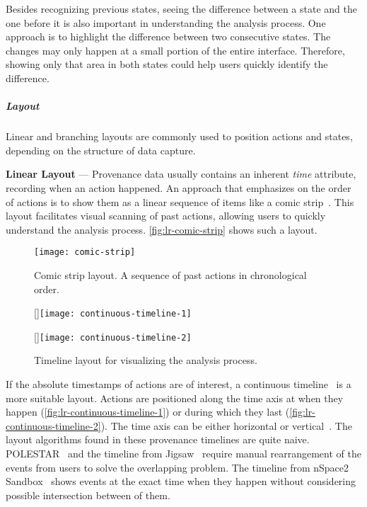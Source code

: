 Besides recognizing previous states, seeing the difference between a state and the one before it is also important in understanding the analysis process. One approach is to highlight the difference between two consecutive states. The changes may only happen at a small portion of the entire interface. Therefore, showing only that area in both states could help users quickly identify the difference.

\subparagraph{Layout} Linear and branching layouts are commonly used to position actions and states, depending on the structure of data capture.

\textbf{Linear Layout} --- Provenance data usually contains an inherent \emph{time} attribute, recording when an action happened. An approach that emphasizes on the order of actions is to show them as a linear sequence of items like a comic strip~\cite{Kurlander1988,Meng1998}. This layout facilitates visual scanning of past actions, allowing users to quickly understand the analysis process. \autoref{fig:lr-comic-strip} shows such a layout.

\begin{figure}
	\centering
	\texttt{[image: comic-strip]}
	\caption[Comic strip layout]{Comic strip layout. A sequence of past actions in chronological order. }
	\label{fig:lr-comic-strip}
\end{figure}

\begin{figure}
	\centering
	[\columnwidth]{\texttt{[image: continuous-timeline-1]}}
	
	\vspace{.5\baselineskip}
	
	[\columnwidth]{\texttt{[image: continuous-timeline-2]}}
	\caption{Timeline layout for visualizing the analysis process.}
\end{figure}

If the absolute timestamps of actions are of interest, a continuous timeline~\cite{Derthick2001} is a more suitable layout. Actions are positioned along the time axis at when they happen (\autoref{fig:lr-continuous-timeline-1}) or during which they last (\autoref{fig:lr-continuous-timeline-2}). The time axis can be either horizontal or vertical~\cite{SandboxTimeline2012}. The layout algorithms found in these provenance timelines are quite naive. POLESTAR~\cite{Pioch2006} and the timeline from Jigsaw~\cite{Liu2010} require manual rearrangement of the events from users to solve the overlapping problem. The timeline from nSpace2 Sandbox~\cite{SandboxTimeline2012} shows events at the exact time when they happen without considering possible intersection between of them.

